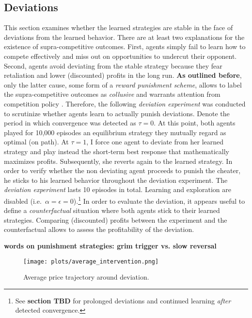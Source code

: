 \subsection{Deviations}\label{deviations}

This section examines whether the learned strategies are stable in the face of deviations from the learned behavior. There are at least two explanations for the existence of supra-competitive outcomes. First, agents simply fail to learn how to compete effectively and miss out on opportunities to undercut their opponent. Second, agents avoid deviating from the stable strategy because they fear retaliation and lower (discounted) profits in the long run. \textbf{As outlined before}, only the latter cause, some form of a \emph{reward punishment scheme}, allows to label the supra-competitive outcomes as \emph{collusive} and warrants attention from competition policy \parencite{assad_algorithmic_2020}. Therefore, the following \emph{deviation experiment} was conducted to scrutinize whether agents learn to actually punish deviations. Denote the period in which convergence was detected as $\tau = 0$. At this point, both agents played for 10,000 episodes an equilibrium strategy they mutually regard as optimal (on path). At $\tau = 1$, I force one agent to deviate from her learned strategy and play instead the short-term best response that mathematically maximizes profits. Subsequently, she reverts again to the learned strategy. In order to verify whether the non deviating agent proceeds to punish the cheater, he sticks to his learned behavior throughout the deviation experiment. The \emph{deviation experiment} lasts 10 episodes in total. Learning and exploration are disabled (i.e.\ $\alpha = \epsilon = 0$).\footnote{See \textbf{section TBD} for prolonged deviations and continued learning \emph{after} detected convergence.} In order to evaluate the deviation, it appears useful to define a \emph{counterfactual} situation where both agents stick to their learned strategies. Comparing (discounted) profits between the experiment and the counterfactual allows to assess the profitability of the deviation.

\textbf{words on punishment strategies: grim trigger vs. slow reversal }

\begin{figure}
	\texttt{[image: plots/average\_intervention.png]}
	\caption{Average price trajectory around deviation. }
	\label{average_intervention}
\end{figure}

